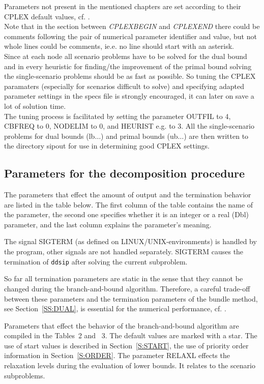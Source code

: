 \documentclass[11pt,draft]{article}
\newcommand{\+}{{\ti{+}}}
\newcommand{\1}{{\ti{1}}}
\begin{document}
Parameters not present in the mentioned chapters are set according to their CPLEX default values,
cf. \cite{cp}. \\
Note that in the section between {\it CPLEXBEGIN} and  {\it CPLEXEND} there could be comments following the pair of numerical parameter identifier and value, but not whole lines could be comments, ie.e. 
no line should start with an asterisk.\\[0.5em]
Since at each node all scenario problems have to be solved for the dual bound and in every heuristic for finding/the improvement of the primal bound solving the single-scenario problems should be as fast as possible. So tuning the CPLEX paramaters (especially for scenarios difficult to solve) and specifying adapted parameter settings in the specs file is strongly encouraged, it can later on save a lot of solution time.\\
The tuning process is facilitated by setting the parameter OUTFIL to 4, CBFREQ to 0, NODELIM to 0, and HEURIST e.g. to 3. All the single-scenario problems for dual bounds (lb$\ldots$) and primal bounds (ub$\ldots$) are then written to the directory sipout for use in determining good CPLEX settings.

%
\subsection{Parameters for the decomposition procedure}
The parameters that effect the amount of output and the termination behavior are listed in the table 
below. The first column of the table contains the name of the parameter, the second one
specifies whether it is an integer or a real (Dbl) parameter, and the last column explains the
parameter's meaning. 

The signal SIGTERM (as defined on LINUX/UNIX-environments) is handled by the program,
other signals are not handled separately. SIGTERM causes the termination of \texttt{ddsip} after 
solving the current subproblem. 

So far all termination parameters are static in the sense that they cannot be changed during the
branch-and-bound algorithm. Therefore, a careful trade-off between these parameters and the
termination parameters of the bundle method, see Section~\ref{SS:DUAL}, is essential for the
numerical performance, cf. \cite{cs2}.  \medskip  

Parameters that effect the behavior of the branch-and-bound algorithm are compiled in the
Tables~2 and ~3. The default values are marked with a star.
The use of start values is described in
Section~\ref{S:START}, the use of priority order information in Section~\ref{S:ORDER}.  The
parameter RELAXL effects the relaxation levels during the evaluation of lower bounds. It relates to
the scenario subproblems. 
\end{document}

